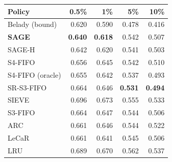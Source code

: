 \begin{tabular}{lrrrr}
\toprule
Policy & 0.5\% & 1\% & 5\% & 10\% \\
\midrule
Belady (bound)~\cite{belady} & 0.620 & 0.590 & 0.478 & 0.416 \\
\textbf{SAGE} & \textbf{0.640} & \textbf{0.618} & 0.542 & 0.507 \\
SAGE-H & 0.642 & 0.620 & 0.541 & 0.503 \\
S4-FIFO~\cite{s4fifo} & 0.656 & 0.645 & 0.542 & 0.510 \\
S4-FIFO (oracle) & 0.655 & 0.642 & 0.537 & 0.493 \\
SR-S3-FIFO~\cite{srgadgets} & 0.664 & 0.646 & \textbf{0.531} & \textbf{0.494} \\
SIEVE~\cite{sieve} & 0.696 & 0.673 & 0.555 & 0.533 \\
S3-FIFO~\cite{s3fifo} & 0.664 & 0.647 & 0.544 & 0.506 \\
ARC~\cite{arc} & 0.661 & 0.646 & 0.544 & 0.522 \\
LeCaR~\cite{lecar} & 0.661 & 0.641 & 0.545 & 0.506 \\
LRU & 0.689 & 0.670 & 0.562 & 0.537 \\
\bottomrule
\end{tabular}
